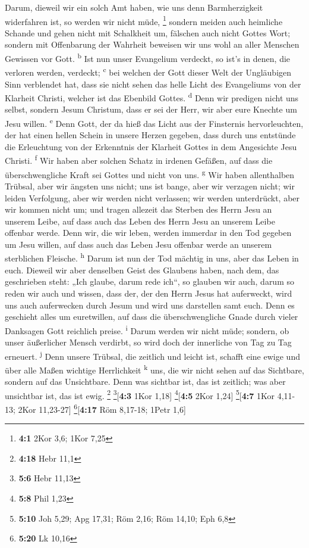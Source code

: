  Darum, dieweil wir ein solch Amt haben, wie uns denn
Barmherzigkeit widerfahren ist, so werden wir nicht müde, \footnote{\textbf{4:1}
  2Kor 3,6; 1Kor 7,25}  sondern meiden auch heimliche
Schande und gehen nicht mit Schalkheit um, fälschen auch nicht Gottes
Wort; sondern mit Offenbarung der Wahrheit beweisen wir uns wohl an
aller Menschen Gewissen vor Gott. \textsuperscript{b}  Ist
nun unser Evangelium verdeckt, so ist's in denen, die verloren werden,
verdeckt; \textsuperscript{c}  bei welchen der Gott dieser
Welt der Ungläubigen Sinn verblendet hat, dass sie nicht sehen das helle
Licht des Evangeliums von der Klarheit Christi, welcher ist das Ebenbild
Gottes. \textsuperscript{d}  Denn wir predigen nicht uns
selbst, sondern Jesum Christum, dass er sei der Herr, wir aber eure
Knechte um Jesu willen. \textsuperscript{e}  Denn Gott,
der da hieß das Licht aus der Finsternis hervorleuchten, der hat einen
hellen Schein in unsere Herzen gegeben, dass durch uns entstünde die
Erleuchtung von der Erkenntnis der Klarheit Gottes in dem Angesichte
Jesu Christi. \textsuperscript{f}  Wir haben aber solchen
Schatz in irdenen Gefäßen, auf dass die überschwengliche Kraft sei
Gottes und nicht von uns. \textsuperscript{g}  Wir haben
allenthalben Trübsal, aber wir ängsten uns nicht; uns ist bange, aber
wir verzagen nicht;  wir leiden Verfolgung, aber wir
werden nicht verlassen; wir werden unterdrückt, aber wir kommen nicht
um;  und tragen allezeit das Sterben des Herrn Jesu an
unserem Leibe, auf dass auch das Leben des Herrn Jesu an unserem Leibe
offenbar werde.  Denn wir, die wir leben, werden immerdar
in den Tod gegeben um Jesu willen, auf dass auch das Leben Jesu offenbar
werde an unserem sterblichen Fleische. \textsuperscript{h}
 Darum ist nun der Tod mächtig in uns, aber das Leben in
euch.  Dieweil wir aber denselben Geist des Glaubens
haben, nach dem, das geschrieben steht: „Ich glaube, darum rede ich``,
so glauben wir auch, darum so reden wir auch  und wissen,
dass der, der den Herrn Jesus hat auferweckt, wird uns auch auferwecken
durch Jesum und wird uns darstellen samt euch.  Denn es
geschieht alles um euretwillen, auf dass die überschwengliche Gnade
durch vieler Danksagen Gott reichlich preise. \textsuperscript{i}
 Darum werden wir nicht müde; sondern, ob unser
äußerlicher Mensch verdirbt, so wird doch der innerliche von Tag zu Tag
erneuert. \textsuperscript{j}  Denn unsere Trübsal, die
zeitlich und leicht ist, schafft eine ewige und über alle Maßen wichtige
Herrlichkeit \textsuperscript{k}  uns, die wir nicht
sehen auf das Sichtbare, sondern auf das Unsichtbare. Denn was sichtbar
ist, das ist zeitlich; was aber unsichtbar ist, das ist ewig.
\footnote{\textbf{4:18} Hebr 11,1} \footnote{\textbf{5:6} Hebr 11,13}{[}\textbf{4:3}
1Kor 1,18{]} \footnote{\textbf{5:8} Phil 1,23}{[}\textbf{4:5} 2Kor
1,24{]} \footnote{\textbf{5:10} Joh 5,29; Apg 17,31; Röm 2,16; Röm
  14,10; Eph 6,8}{[}\textbf{4:7} 1Kor 4,11-13; 2Kor 11,23-27{]}
\footnote{\textbf{5:20} Lk 10,16}{[}\textbf{4:17} Röm 8,17-18; 1Petr
1,6{]}

